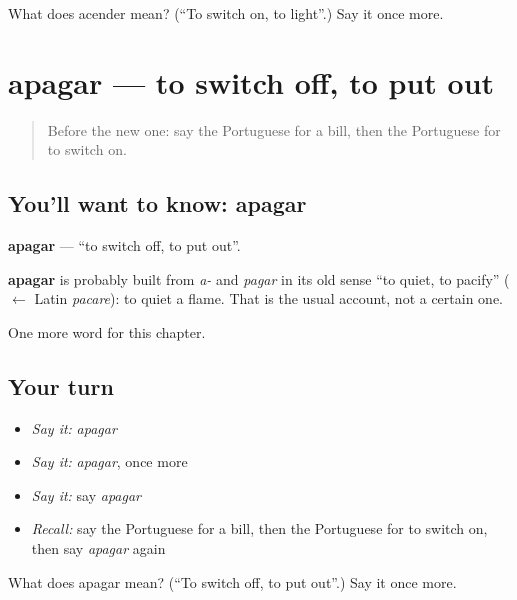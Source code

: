 \begin{tcolorbox}[breakable,colback=teal!4,colframe=teal!35!black,title={Before you move on}]
What does acender mean? (\textquotedblleft{}To switch on, to light\textquotedblright{}.) Say it once more.
\end{tcolorbox}
\section[apagar]{apagar — to switch off, to put out}

\label{lesson:PT-C138-apagar}



\begin{quote}
Before the new one: say the Portuguese for a bill, then the Portuguese for to switch on.
\end{quote}

\subsection*{You'll want to know: apagar}
\textbf{apagar} — \textquotedblleft{}to switch off, to put out\textquotedblright{}.

\begin{cousinweb}
\textbf{apagar} is probably built from \emph{a-} and \emph{pagar} in its old sense \textquotedblleft{}to quiet, to pacify\textquotedblright{} ($\leftarrow$ Latin \emph{pacare}): to quiet a flame. That is the usual account, not a certain one.
\end{cousinweb}

\begin{grammarlens}[title={What you've built}]
One more word for this chapter.
\end{grammarlens}

\subsection*{Your turn}
\begin{itemize}
\raggedright
  \item \emph{Say it:} \emph{apagar}
  \item \emph{Say it:} \emph{apagar}, once more
  \item \emph{Say it:} say \emph{apagar}
  \item \emph{Recall:} say the Portuguese for a bill, then the Portuguese for to switch on, then say \emph{apagar} again
\end{itemize}

\begin{tcolorbox}[breakable,colback=teal!4,colframe=teal!35!black,title={Before you move on}]
What does apagar mean? (\textquotedblleft{}To switch off, to put out\textquotedblright{}.) Say it once more.
\end{tcolorbox}
